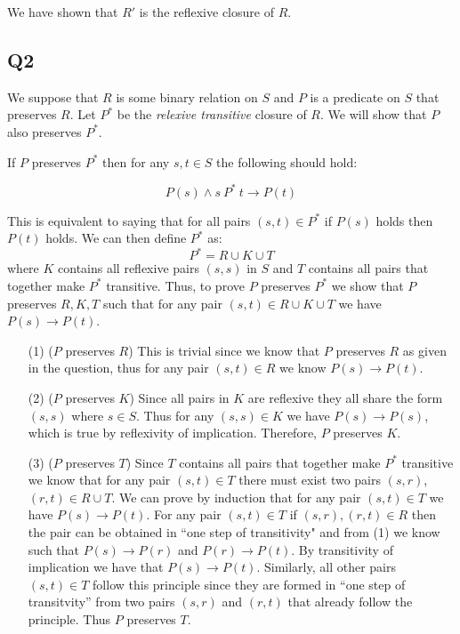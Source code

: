 \documentclass[12pt, fleqn]{article}
\begin{document}
\medskip 
We have shown that $R'$ is the reflexive closure of $R$. 

\subsection{Q2}

We suppose that $R$ is some binary relation on $S$ and $P$ is a predicate on $S$ that preserves $R$. 
Let $P^*$ be the \emph{relexive transitive} closure of $R$. We will show that $P$ also preserves $P^*$.

\medskip

If $P$ preserves $P^*$ then for any $s, t \in S$ the following should hold:

$$P(s) \land s~P^*~t \rightarrow P(t)$$

This is equivalent to saying that for all pairs $(s, t) \in P^*$ if $P(s)$ holds then $P(t)$ holds. We can then
define $P^*$ as:
$$P^* = R \cup K \cup T$$
where $K$ contains all reflexive pairs $(s, s)$ in $S$ and $T$ contains all pairs that together make $P^*$ transitive.
Thus, to prove $P$ preserves $P^*$ we show that $P$ preserves $R, K, T$ such that for any pair $(s, t) \in R \cup K \cup T$ we
have $P(s) \rightarrow P(t)$.

\begin{enumerate}
    \item[(1)] ($P$ preserves $R$) This is trivial since we know that $P$ preserves  $R$ as given in the question, thus for any
    pair $(s, t) \in R$ we know $P(s) \rightarrow P(t)$.
     
    \item[(2)] ($P$ preserves $K$) Since all pairs in $K$ are reflexive they all share the form $(s, s)$ where $s \in S$. 
    Thus for any $(s, s) \in K$ we have $P(s) \rightarrow P(s)$, which is true by reflexivity of implication. Therefore, $P$
    preserves $K$.

    \item[(3)] ($P$ preserves $T$) Since $T$ contains all pairs that together make $P^*$ transitive we know that for any pair
    $(s, t) \in T$ there must exist two pairs $(s, r)$,$(r, t) \in R \cup T$. 
    We can prove by induction that for any pair $(s, t) \in T$ we have $P(s) \rightarrow P(t)$. For any pair $(s, t) \in T$
    if $(s, r),(r,t) \in R$ then the pair can be obtained in ``one step of transitivity" and from (1) we know such 
    that $P(s) \rightarrow P(r)$ and $P(r) \rightarrow P(t)$. By transitivity of implication we have that $P(s) \rightarrow P(t)$.
    Similarly, all other pairs $(s, t) \in T$ follow this principle since they are formed in ``one step of transitvity'' from two pairs 
    $(s, r)$ and $(r, t)$ that already follow the principle. Thus $P$ preserves $T$.
\end{enumerate}
\end{document}
